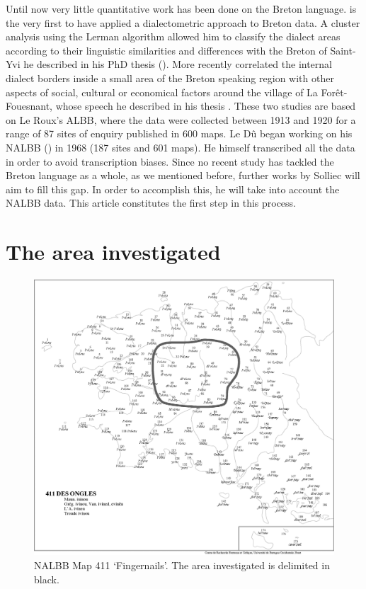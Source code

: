 \documentclass[output=paper]{LSP/langsci}
\begin{document}
Until now very little quantitative work has been done on the Breton language. \citet{german_etude_1984,german_methode_1991} is the very first to have applied a dialectometric approach to Breton data. A cluster analysis using the Lerman algorithm allowed him to classify the dialect areas according to their linguistic similarities and differences with the Breton of Saint-Yvi he described in his PhD thesis (\citeyear{german_etude_1984}). More recently \citet{costaouec_linguistic_2012} correlated the internal dialect borders inside a small area of the Breton speaking region with other aspects of social, cultural or economical factors around the village of La Forêt-Fouesnant, whose speech he described in his thesis \citep{costaouec_breton_1998}. These two studies are based on Le Roux's ALBB, where the data were collected between 1913 and 1920 for a range of 87 sites of enquiry published in 600 maps. Le Dû began working on his NALBB (\citeyear{le_du_nouvel_2001}) in 1968 (187 sites and 601 maps). He himself transcribed all the data in order to avoid transcription biases. Since no recent study has tackled the Breton language as a whole, as we mentioned before, further works by Solliec will aim to fill this gap. In order to accomplish this, he will take into account the NALBB data. This article constitutes the first step in this process.

\section{The area investigated}

\begin{figure}
\includegraphics[width=\textwidth]{illustrations/brun_etal_fig2}
\caption{NALBB Map 411 ‘Fingernails’. The area investigated is delimited in black.}
\end{figure}
\end{document}
